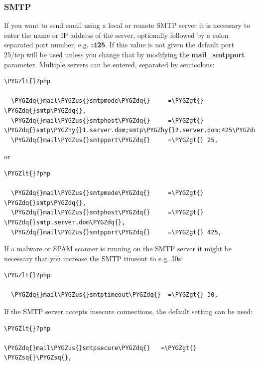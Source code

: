 \documentclass[letterpaper,10pt,english]{sphinxmanual}
\def\PYGZus{\char`\_}
\def\PYGZlt{\char`\<}
\def\PYGZgt{\char`\>}
\def\PYGZhy{\char`\-}
\def\PYGZsq{\char`\'}
\def\PYGZdq{\char`\"}
\begin{document}
\subsubsection{SMTP}
\label{configuration_server/email_configuration:smtp}
If you want to send email using a local or remote SMTP server it is necessary
to enter the name or IP address of the server, optionally followed by a colon
separated port number, e.g. \textbf{:425}. If this value is not given the default
port 25/tcp will be used unless you change that by modifying the
\textbf{mail\_smtpport} parameter. Multiple servers can be entered, separated by
semicolons:

\begin{Verbatim}[commandchars=\\\{\}]
\PYGZlt{}?php

  \PYGZdq{}mail\PYGZus{}smtpmode\PYGZdq{}     =\PYGZgt{} \PYGZdq{}smtp\PYGZdq{},
  \PYGZdq{}mail\PYGZus{}smtphost\PYGZdq{}     =\PYGZgt{} \PYGZdq{}smtp\PYGZhy{}1.server.dom;smtp\PYGZhy{}2.server.dom:425\PYGZdq{},
  \PYGZdq{}mail\PYGZus{}smtpport\PYGZdq{}     =\PYGZgt{} 25,
\end{Verbatim}

or

\begin{Verbatim}[commandchars=\\\{\}]
\PYGZlt{}?php

  \PYGZdq{}mail\PYGZus{}smtpmode\PYGZdq{}     =\PYGZgt{} \PYGZdq{}smtp\PYGZdq{},
  \PYGZdq{}mail\PYGZus{}smtphost\PYGZdq{}     =\PYGZgt{} \PYGZdq{}smtp.server.dom\PYGZdq{},
  \PYGZdq{}mail\PYGZus{}smtpport\PYGZdq{}     =\PYGZgt{} 425,
\end{Verbatim}

If a malware or SPAM scanner is running on the SMTP server it might be
necessary that you increase the SMTP timeout to e.g. 30s:

\begin{Verbatim}[commandchars=\\\{\}]
\PYGZlt{}?php

  \PYGZdq{}mail\PYGZus{}smtptimeout\PYGZdq{}  =\PYGZgt{} 30,
\end{Verbatim}

If the SMTP server accepts insecure connections, the default setting can be
used:

\begin{Verbatim}[commandchars=\\\{\}]
\PYGZlt{}?php

\PYGZdq{}mail\PYGZus{}smtpsecure\PYGZdq{}   =\PYGZgt{} \PYGZsq{}\PYGZsq{},
\end{Verbatim}
\end{document}

